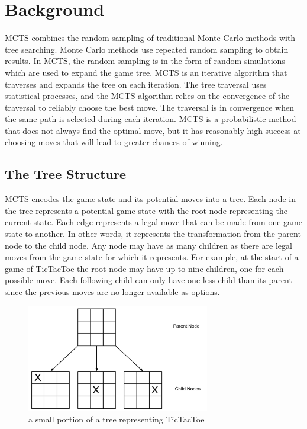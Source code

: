 \documentclass{sig-alternate}
\begin{document}
\section{Background}
MCTS combines the random sampling of traditional Monte Carlo methods with tree searching. Monte Carlo methods use repeated random sampling to obtain results. In MCTS, the random sampling is in the form of random simulations which are used to expand the game tree. MCTS is an iterative algorithm that traverses and expands the tree on each iteration. The tree traversal uses statistical processes, and the MCTS algorithm relies on the convergence of the traversal to reliably choose the best move. The traversal is in convergence when the same path is selected during each iteration. MCTS is a probabilistic method that does not always find the optimal move, but it has reasonably high success at choosing moves that will lead to greater chances of winning.

\subsection{The Tree Structure}\label{sec:TreeStructure}
MCTS encodes the game state and its potential moves into a tree. Each node in the tree represents a potential game state with the root node representing the current state. Each edge represents a legal move that can be made from one game state to another. In other words, it represents the transformation from the parent node to the child node. Any node may have as many children as there are legal moves from the game state for which it represents. For example, at the start of a game of TicTacToe the root node may have up to nine children, one for each possible move. Each following child can only have one less child than its parent since the previous moves are no longer available as options.

\begin{figure}[h]
\includegraphics[width=8cm]{TicTacToeTree.pdf}
\centering
\caption{a small portion of a tree representing TicTacToe}
\label{fig:TicTacToe}
\end{figure}
\end{document}
